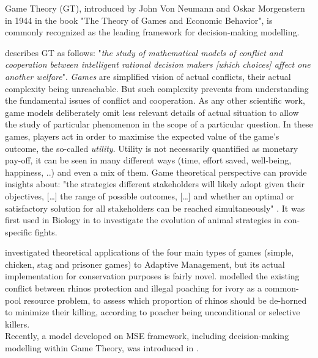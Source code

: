 \documentclass[12pt,a4paper]{article}
\begin{document}
Game Theory (GT), introduced by John Von Neumann and Oskar Morgenstern in 1944 in the book "The Theory of Games and Economic Behavior", is commonly recognized as the leading framework for decision-making modelling.

\cite{myerson1997game} describes GT as follows: "\textit{the study of mathematical models of conflict and cooperation between intelligent rational decision makers [which choices] affect one another welfare}".
\textit{Games} are simplified vision of actual conflicts, their actual complexity being unreachable.
But such complexity prevents from understanding the fundamental issues of conflict and cooperation.
As any other scientific work, game models deliberately omit less relevant details of actual situation to allow the study of particular phenomenon in the scope of a particular question.
In these games, players act in order to maximise the expected value of the game's outcome, the so-called \textit{utility}.
Utility is not necessarily quantified as monetary pay-off, it can be seen in many different ways (time, effort saved, well-being, happiness, ..) and even a mix of them.
Game theoretical perspective can provide insights about: "the strategies different stakeholders will likely adopt given their objectives, [\dots] the range of possible outcomes, [\dots] and whether an optimal or satisfactory solution for all stakeholders can be reached simultaneously" \citep{COLYVAN20111246}.
It was first used in Biology in \cite{maynard1973logic} to investigate the evolution of animal strategies in con-specific fights.

\cite{COLYVAN20111246} investigated theoretical applications of the four main types of games (simple, chicken, stag and prisoner games) to Adaptive Management, but its actual implementation for conservation purposes is fairly novel. 
\cite{glynatsi2018evolutionary} modelled the existing conflict between rhinos protection and illegal poaching for ivory as a common-pool resource problem, to assess which proportion of rhinos should be de-horned to minimize their killing, according to poacher being unconditional or selective killers.\\ %
Recently, a model developed on MSE framework, including decision-making modelling within Game Theory, was introduced in \cite{duthie2018} .
\end{document}
